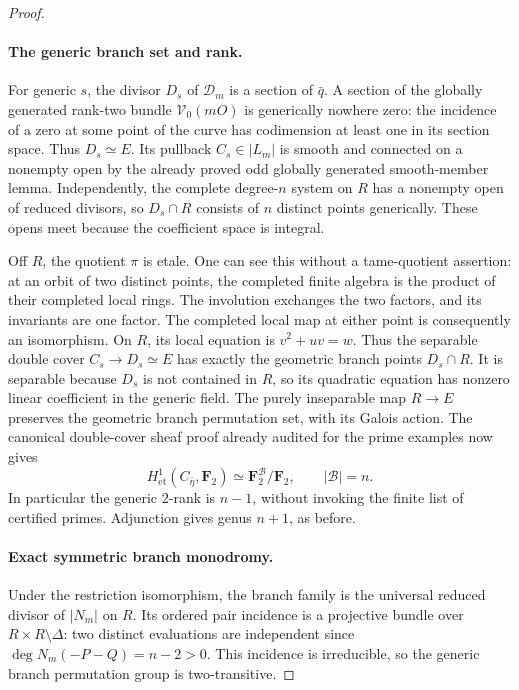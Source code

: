 \begin{proof}
\paragraph{The generic branch set and rank.}
For generic \(s\), the divisor \(D_s\) of \(\mathcal D_m\)
is a section of \(\bar q\). A section of the globally generated
rank-two bundle \(\mathcal V_0(mO)\) is generically nowhere zero:
the incidence of a zero at some point of the curve has codimension
at least one in its section space. Thus \(D_s\simeq E\).
Its pullback \(C_s\in|L_m|\) is smooth and connected on a
nonempty open by the already proved odd globally generated
smooth-member lemma. Independently, the complete degree-\(n\)
system on \(R\) has a nonempty open of reduced divisors, so
\(D_s\cap R\) consists of \(n\) distinct points generically.
These opens meet because the coefficient space is integral.

Off \(R\), the quotient \(\pi\) is etale. One can
see this without a tame-quotient assertion: at an orbit of two
distinct points, the completed finite algebra is the product of
their completed local rings. The involution exchanges the two
factors, and its invariants are one factor. The completed local
map at either point is consequently an isomorphism. On \(R\), its
local equation is \(v^2+uv=w\). Thus the separable double cover
\(C_s\to D_s\simeq E\) has exactly the geometric branch
points \(D_s\cap R\). It is separable because \(D_s\) is not
contained in \(R\), so its quadratic equation has nonzero linear
coefficient in the generic field. The purely inseparable map
\(R\to E\) preserves the geometric branch permutation set,
with its Galois action. The canonical double-cover sheaf proof
already audited for the prime examples now gives
\[
 H^1_{\mathrm{et}}(C_{\bar\eta},\mathbf F_2)
          \simeq \mathbf F_2^{\mathcal B}/\mathbf F_2,
 \qquad |\mathcal B|=n.
\]
In particular the generic \(2\)-rank is \(n-1\), without invoking
the finite list of certified primes. Adjunction gives genus
\(n+1\), as before.

\paragraph{Exact symmetric branch monodromy.}
Under the restriction isomorphism, the branch family is the
universal reduced divisor of \(|N_m|\) on \(R\). Its ordered
pair incidence is a projective bundle over
\(R\times R\setminus\Delta\): two distinct evaluations are
independent since \(\deg N_m(-P-Q)=n-2>0\). This incidence
is irreducible, so the generic branch permutation group is
two-transitive.


\end{proof}
